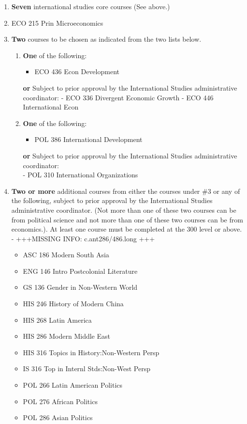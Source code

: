 \documentclass[
  letterpaper,
]{scrbook}
\providecommand{\tightlist}{%
  \setlength{\itemsep}{0pt}\setlength{\parskip}{0pt}}
\begin{document}
\begin{enumerate}
\def\labelenumi{\arabic{enumi}.}
\item
  \textbf{Seven} international studies core courses (See above.)
\item
  ECO 215 Prin Microeconomics
\item
  \textbf{Two} courses to be chosen as indicated from the two lists
  below.

  \begin{enumerate}
  \def\labelenumii{\alph{enumii}.}
  \item
    \textbf{One} of the following:

    \begin{itemize}
    \tightlist
    \item
      ECO 436 Econ Development
    \end{itemize}

    \textbf{or} Subject to prior approval by the International Studies
    administrative coordinator: - ECO 336 Divergent Economic Growth -
    ECO 446 International Econ
  \item
    \textbf{One} of the following:

    \begin{itemize}
    \tightlist
    \item
      POL 386 International Development
    \end{itemize}

    \textbf{or} Subject to prior approval by the International Studies
    administrative coordinator:\\
    - POL 310 International Organizations
  \end{enumerate}
\item
  \textbf{Two or more} additional courses from either the courses under
  \#3 or any of the following, subject to prior approval by the
  International Studies administrative coordinator. (Not more than one
  of these two courses can be from political science and not more than
  one of these two courses can be from economics.). At least one course
  must be completed at the 300 level or above. - +++MISSING INFO:
  c.ant286/486.long +++

  \begin{itemize}
  \tightlist
  \item
    ASC 186 Modern South Asia
  \item
    ENG 146 Intro Postcolonial Literature
  \item
    GS 136 Gender in Non-Western World
  \item
    HIS 246 History of Modern China
  \item
    HIS 268 Latin America
  \item
    HIS 286 Modern Middle East
  \item
    HIS 316 Topics in History:Non-Western Persp
  \item
    IS 316 Top in Internl Stds:Non-West Persp
  \item
    POL 266 Latin American Politics
  \item
    POL 276 African Politics
  \item
    POL 286 Asian Politics
  \end{itemize}
\end{enumerate}
\end{document}
